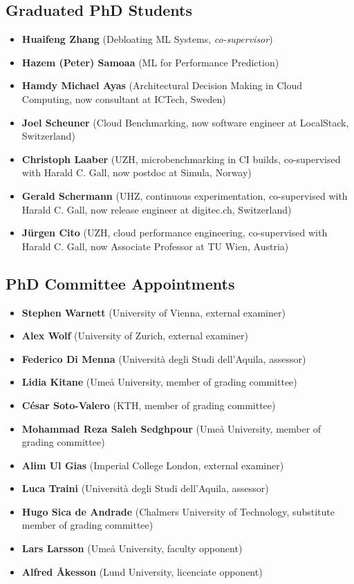 \documentclass[paper=letter,fontsize=11pt]{scrartcl} %
\begin{document}
\subsection*{Graduated PhD Students}

\begin{itemize}
\item \textbf{Huaifeng Zhang}  (Debloating ML Systems, \emph{co-supervisor})  
\item \textbf{Hazem (Peter) Samoaa}  (ML for Performance Prediction)
\item \textbf{Hamdy Michael Ayas}  (Architectural Decision Making in Cloud Computing, now consultant at ICTech, Sweden)
\item \textbf{Joel Scheuner}  (Cloud Benchmarking, now software engineer at LocalStack, Switzerland)
\item \textbf{Christoph Laaber} (UZH, microbenchmarking in CI builds, co-supervised with Harald C. Gall, now postdoc at Simula, Norway)
\item \textbf{Gerald Schermann} (UHZ, continuous experimentation, co-supervised with Harald C. Gall, now release engineer at digitec.ch, Switzerland)
\item \textbf{J\"urgen Cito} (UZH, cloud performance engineering, co-supervised with Harald C. Gall, now Associate Professor at TU Wien, Austria)
\end{itemize}

\subsection*{PhD Committee Appointments}

\begin{itemize}
\item \textbf{Stephen Warnett} (University of Vienna, external examiner)
\item \textbf{Alex Wolf} (University of Zurich, external examiner)
\item \textbf{Federico Di Menna} (Università degli Studi dell'Aquila, assessor)
\item \textbf{Lidia Kitane} (Umeå University, member of grading committee)
\item \textbf{César Soto-Valero} (KTH, member of grading committee)
\item \textbf{Mohammad Reza Saleh Sedghpour} (Umeå University, member of grading committee)
\item \textbf{Alim Ul Gias} (Imperial College London, external examiner) 
\item \textbf{Luca Traini} (Università degli Studi dell'Aquila, assessor) 
\item \textbf{Hugo Sica de Andrade} (Chalmers University of Technology, substitute member of grading committee) 
\item \textbf{Lars Larsson} (Umeå University, faculty opponent)
\item \textbf{Alfred Åkesson} (Lund University, licenciate opponent)
\end{itemize}
\end{document}
